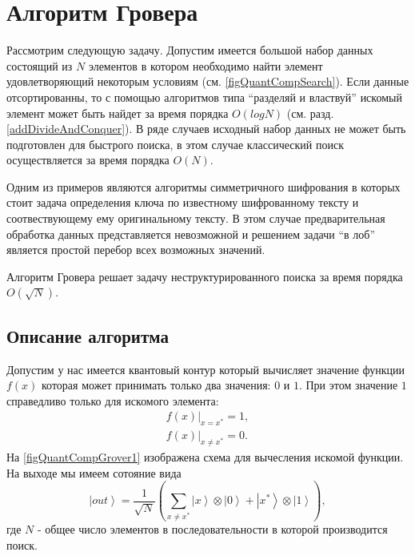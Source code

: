 \section{Алгоритм Гровера}
Рассмотрим следующую задачу. Допустим имеется большой набор данных
состоящий из $N$ элементов в котором необходимо найти элемент
удовлетворяющий некоторым условиям (см. \autoref{figQuantCompSearch}).
Если данные отсортированны, то с  
помощью алгоритмов типа ``разделяй и властвуй'' искомый элемент может
быть найдет за время порядка $O\left(log N\right)$
(см. разд. \ref{addDivideAndConquer}). В ряде случаев исходный набор данных
не может быть подготовлен для быстрого поиска, в этом случае
классический поиск осуществляется за время порядка $O\left(N\right)$.



Одним из примеров являются алгоритмы симметричного шифрования в
которых стоит задача определения ключа по известному шифрованному
тексту и соотвествующему ему оригинальному тексту. В этом случае
предварительная обработка данных представляется невозможной и решением
задачи ``в лоб'' является простой перебор всех возможных значений.

Алгоритм Гровера \cite{Grover96afast} решает задачу
неструктурированного поиска за время порядка $O\left(\sqrt{N}\right)$.

\subsection{Описание алгоритма}

Допустим у нас имеется квантовый контур который вычисляет значение
функции $f\left(x\right)$ которая может принимать только два значения:
$0$ и $1$. При этом значение $1$ справедливо только для искомого
элемента: 
\begin{eqnarray}
\left.f\left(x\right)\right|_{x = x^{\ast}} = 1,
\nonumber \\
\left.f\left(x\right)\right|_{x \ne x^{\ast}} = 0.
\label{eqQuantCompGroverF}
\end{eqnarray}
На \autoref{figQuantCompGrover1} изображена схема для вычесления
искомой функции. На выходе мы имеем сотояние вида
\begin{equation}
\left|out\right> = \frac{1}{\sqrt{N}}\left(
 \sum_{x \ne x^{\ast}} \left|x\right>\otimes\left|0\right>
+ \left|x^{\ast}\right>\otimes\left|1\right>
\right),
\label{eqQuantCompGroverFake}
\end{equation}
где $N$ - общее число элементов в последовательности в которой
производится поиск.

